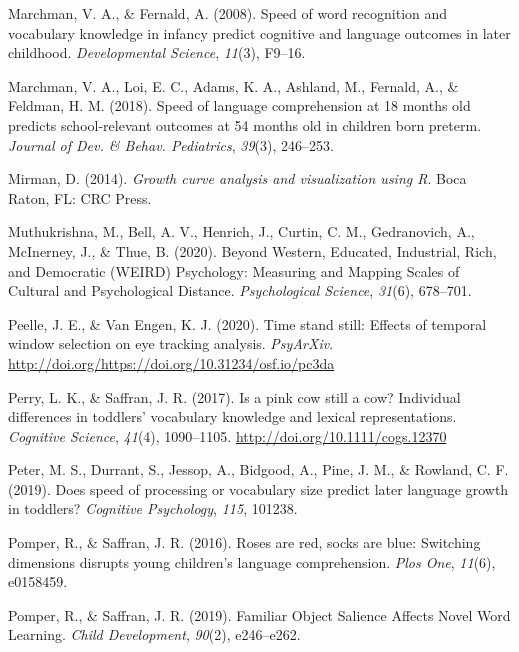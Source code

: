\documentclass[10pt, letterpaper]{article}
\begin{document}
\leavevmode\hypertarget{ref-Marchman2008}{}%
Marchman, V. A., \& Fernald, A. (2008). Speed of word recognition and
vocabulary knowledge in infancy predict cognitive and language outcomes
in later childhood. \emph{Developmental Science}, \emph{11}(3), F9--16.

\leavevmode\hypertarget{ref-Marchman2018}{}%
Marchman, V. A., Loi, E. C., Adams, K. A., Ashland, M., Fernald, A., \&
Feldman, H. M. (2018). Speed of language comprehension at 18 months old
predicts school-relevant outcomes at 54 months old in children born
preterm. \emph{Journal of Dev. \& Behav. Pediatrics}, \emph{39}(3),
246--253.

\leavevmode\hypertarget{ref-Mirman2014}{}%
Mirman, D. (2014). \emph{Growth curve analysis and visualization using
R}. Boca Raton, FL: CRC Press.

\leavevmode\hypertarget{ref-Muthukrishna2020}{}%
Muthukrishna, M., Bell, A. V., Henrich, J., Curtin, C. M., Gedranovich,
A., McInerney, J., \& Thue, B. (2020). Beyond Western, Educated,
Industrial, Rich, and Democratic (WEIRD) Psychology: Measuring and
Mapping Scales of Cultural and Psychological Distance.
\emph{Psychological Science}, \emph{31}(6), 678--701.

\leavevmode\hypertarget{ref-Peelle2020}{}%
Peelle, J. E., \& Van Engen, K. J. (2020). Time stand still: Effects of
temporal window selection on eye tracking analysis. \emph{PsyArXiv}.
\url{http://doi.org/https://doi.org/10.31234/osf.io/pc3da}

\leavevmode\hypertarget{ref-Perry2017}{}%
Perry, L. K., \& Saffran, J. R. (2017). Is a pink cow still a cow?
Individual differences in toddlers' vocabulary knowledge and lexical
representations. \emph{Cognitive Science}, \emph{41}(4), 1090--1105.
\url{http://doi.org/10.1111/cogs.12370}

\leavevmode\hypertarget{ref-peter2019}{}%
Peter, M. S., Durrant, S., Jessop, A., Bidgood, A., Pine, J. M., \&
Rowland, C. F. (2019). Does speed of processing or vocabulary size
predict later language growth in toddlers? \emph{Cognitive Psychology},
\emph{115}, 101238.

\leavevmode\hypertarget{ref-Pomper2016}{}%
Pomper, R., \& Saffran, J. R. (2016). Roses are red, socks are blue:
Switching dimensions disrupts young children's language comprehension.
\emph{Plos One}, \emph{11}(6), e0158459.

\leavevmode\hypertarget{ref-Pomper2019}{}%
Pomper, R., \& Saffran, J. R. (2019). Familiar Object Salience Affects
Novel Word Learning. \emph{Child Development}, \emph{90}(2), e246--e262.
\end{document}

